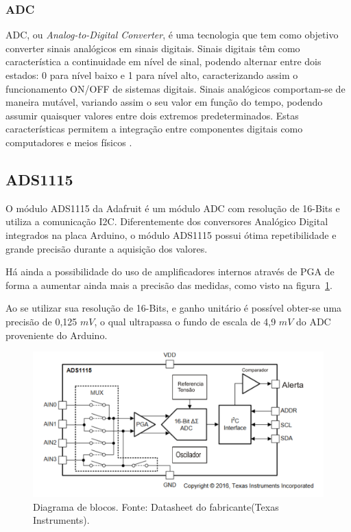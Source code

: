 \subsubsection{ADC}

ADC, ou \textit{Analog-to-Digital Converter}, é uma tecnologia que tem como objetivo converter sinais analógicos em sinais digitais. Sinais digitais têm como característica a continuidade em nível de sinal, podendo alternar entre dois estados: 0 para nível baixo e 1 para nível alto, caracterizando assim o funcionamento ON/OFF de sistemas digitais.
 Sinais analógicos comportam-se de maneira mutável, variando assim o seu valor em função do tempo, podendo assumir quaisquer valores entre dois extremos predeterminados. Estas características permitem a integração entre componentes digitais como computadores e meios físicos \cite{capuano2018elementos}.

\subsection{ADS1115}
O módulo ADS1115 da Adafruit é um módulo ADC com resolução de 16-Bits e utiliza a comunicação I2C. Diferentemente dos conversores Analógico Digital integrados na placa Arduino, o módulo ADS1115 possui ótima repetibilidade e grande precisão durante a aquisição dos valores.

Há ainda a possibilidade do uso de amplificadores internos através de PGA de forma a aumentar ainda mais a precisão das medidas, como visto na figura~\ref{fig:Ads}.

Ao se utilizar sua resolução de 16-Bits, e ganho unitário é possível obter-se uma precisão de 0,125 $mV$, o qual ultrapassa o fundo de escala de 4,9 $mV$ do ADC proveniente do Arduino.%
\FloatBarrier
\begin{figure}[!htbp]
	\centering
	\includegraphics[scale=0.7]{imagens/ADS}
	\caption{Diagrama de blocos. Fonte: Datasheet do fabricante(Texas Instruments). }%
	
	\label{fig:Ads}
\end{figure}
\FloatBarrier

